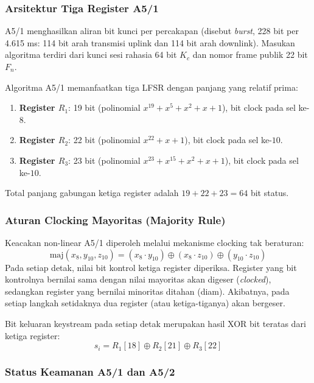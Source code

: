 \subsubsection{Arsitektur Tiga Register A5/1}

A5/1 menghasilkan aliran bit kunci per percakapan (disebut \textit{burst}, 228 bit per 4.615 ms: 114 bit arah transmisi uplink dan 114 bit arah downlink). Masukan algoritma terdiri dari kunci sesi rahasia 64 bit $K_c$ dan nomor frame publik 22 bit $F_n$.

Algoritma A5/1 memanfaatkan tiga LFSR dengan panjang yang relatif prima:
\begin{enumerate}
  \item \textbf{Register $R_1$}: 19 bit (polinomial $x^{19} + x^5 + x^2 + x + 1$), bit clock pada sel ke-$8$.
  \item \textbf{Register $R_2$}: 22 bit (polinomial $x^{22} + x + 1$), bit clock pada sel ke-$10$.
  \item \textbf{Register $R_3$}: 23 bit (polinomial $x^{23} + x^{15} + x^2 + x + 1$), bit clock pada sel ke-$10$.
\end{enumerate}
Total panjang gabungan ketiga register adalah $19 + 22 + 23 = 64$ bit status.

\subsubsection{Aturan Clocking Mayoritas (Majority Rule)}

Keacakan non-linear A5/1 diperoleh melalui mekanisme clocking tak beraturan:
\begin{equation}
  \text{maj}(x_8, y_{10}, z_{10}) = (x_8 \cdot y_{10}) \oplus (x_8 \cdot z_{10}) \oplus (y_{10} \cdot z_{10})
\end{equation}
Pada setiap detak, nilai bit kontrol ketiga register diperiksa. Register yang bit kontrolnya bernilai sama dengan nilai mayoritas akan digeser (\textit{clocked}), sedangkan register yang bernilai minoritas ditahan (diam). Akibatnya, pada setiap langkah setidaknya dua register (atau ketiga-tiganya) akan bergeser.

Bit keluaran keystream pada setiap detak merupakan hasil XOR bit teratas dari ketiga register:
\begin{equation}
  s_i = R_1[18] \oplus R_2[21] \oplus R_3[22]
\end{equation}

\subsubsection{Status Keamanan A5/1 dan A5/2}

